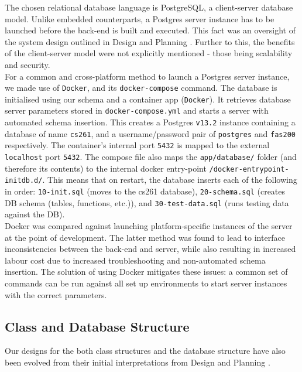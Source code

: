 \documentclass[9pt, titlepage]{extarticle}
\begin{document}
The chosen relational database language is PostgreSQL, a client-server database model. Unlike embedded counterparts, a Postgres server instance has to be launched before the back-end is built and executed.
This fact was an oversight of the system design outlined in Design and Planning \cite{design-and-planning}. Further to this, the benefits of the client-server model were not explicitly mentioned - those being scalability and security. \\

For a common and cross-platform method to launch a Postgres server instance, we made use of \texttt{Docker}, and its \texttt{docker-compose} command. The database is initialised using our schema and a container app (\texttt{Docker}). It retrieves database server parameters stored in \texttt{docker-compose.yml} and starts a server with automated schema insertion. This creates a Postgres \texttt{v13.2} instance containing a database of name \texttt{cs261}, and a username/password pair of \texttt{postgres} and \texttt{fas200} respectively. The container's internal port \texttt{5432} is mapped to the external \texttt{localhost} port \texttt{5432}. The compose file also maps the \texttt{app/database/} folder (and therefore its contents) to the internal docker entry-point \texttt{/docker-entrypoint-initdb.d/}. This means that on restart, the database inserts each of the following in order: \texttt{10-init.sql} (moves to the cs261 database), \texttt{20-schema.sql} (creates DB schema (tables, functions, etc.)), and \texttt{30-test-data.sql} (runs testing data against the DB). \\

Docker was compared against launching platform-specific instances of the server at the point of development. The latter method was found to lead to interface inconsistencies between the back-end and server, while also resulting in increased labour cost due to increased troubleshooting and non-automated schema insertion. The solution of using Docker mitigates these issues: a common set of commands can be run against all set up environments to start server instances with the correct parameters.

\subsection{Class and Database Structure}

Our designs for the both class structures and the database structure have also been evolved from their initial interpretations from Design and Planning \cite{design-and-planning}. \\
\end{document}
